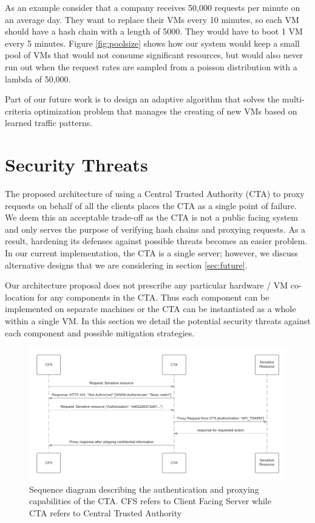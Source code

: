 \documentclass[a4paper,twoside]{article}
\begin{document}
As an example consider that a company receives 50,000 requests per minute on an average day.  They want to replace their VMs every 10 minutes, so each VM should have a hash chain with a length of 5000.   They would have to boot 1 VM every 5 minutes.  Figure \ref{fig:poolsize} shows how our system would keep a small pool of VMs that would not consume significant resources, but would also never run out when the request rates are sampled from a poisson distribution with a lambda of 50,000.


Part of our future work is to design an adaptive algorithm that solves the multi-criteria optimization problem that manages the creating of new VMs based on learned traffic patterns.

\section{Security Threats}

The proposed architecture of using a Central Trusted Authority (CTA) to proxy requests on behalf of all the clients places the CTA as a single point of failure. We deem this an acceptable trade-off as the CTA is not a public facing system and only serves the purpose of verifying hash chains and proxying requests.  As a result, hardening its defenses against possible threats becomes an easier problem.  In our current implementation, the CTA is a single server; however, we discuss alternative designs that we are considering in section \ref{sec:future}.

Our architecture proposal does not prescribe any particular hardware / VM co-location for any components in the CTA. Thus each component can be implemented on separate machines or the CTA can be instantiated as a whole within a single VM. In this section we detail the potential security threats against each component and possible mitigation strategies.

\begin{figure}[!ht]
  \centering
  \includegraphics[keepaspectratio=true,scale=0.175]{sequence_diagram}
  \caption{Sequence diagram describing the authentication and proxying capabilities of the CTA. CFS refers to Client Facing Server while CTA refers to Central Trusted Authority}
  \label{fig:ctaarchitecture}
\end{figure}
\end{document}
